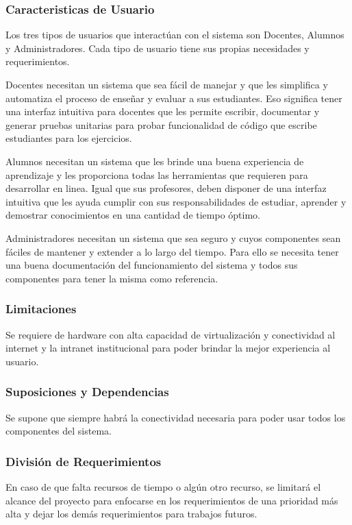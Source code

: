 \subsubsection{Caracteristicas de Usuario}
Los tres tipos de usuarios que interactúan con el sistema son Docentes, Alumnos y Administradores. Cada tipo de usuario tiene sus propias necesidades y requerimientos.

    
Docentes necesitan un sistema que sea fácil de manejar y que les simplifica y automatiza el proceso de enseñar y evaluar a sus estudiantes. Eso significa tener una interfaz intuitiva para docentes que les permite escribir, documentar y generar pruebas unitarias para probar funcionalidad de código que escribe estudiantes para los ejercicios.

    
Alumnos necesitan un sistema que les brinde una buena experiencia de aprendizaje y les proporciona todas las herramientas que requieren para desarrollar en linea. Igual que sus profesores, deben disponer de una interfaz intuitiva que les ayuda cumplir con sus responsabilidades de estudiar, aprender y demostrar conocimientos en una cantidad de tiempo óptimo.

Administradores necesitan un sistema que sea seguro y cuyos componentes sean fáciles de mantener y extender a lo largo del tiempo. Para ello se necesita tener una buena documentación del funcionamiento del sistema y todos sus componentes para tener la misma como referencia.

\subsubsection{Limitaciones}
Se requiere de hardware con alta capacidad de virtualización y conectividad al internet y la intranet institucional para poder brindar la mejor experiencia al usuario.

\subsubsection{Suposiciones y Dependencias}
Se supone que siempre habrá la conectividad necesaria para poder usar todos los componentes del sistema.

\subsubsection{División de Requerimientos}
En caso de que falta recursos de tiempo o algún otro recurso, se limitará el alcance del proyecto para enfocarse en los requerimientos de una prioridad más alta y dejar los demás requerimientos para trabajos futuros.

